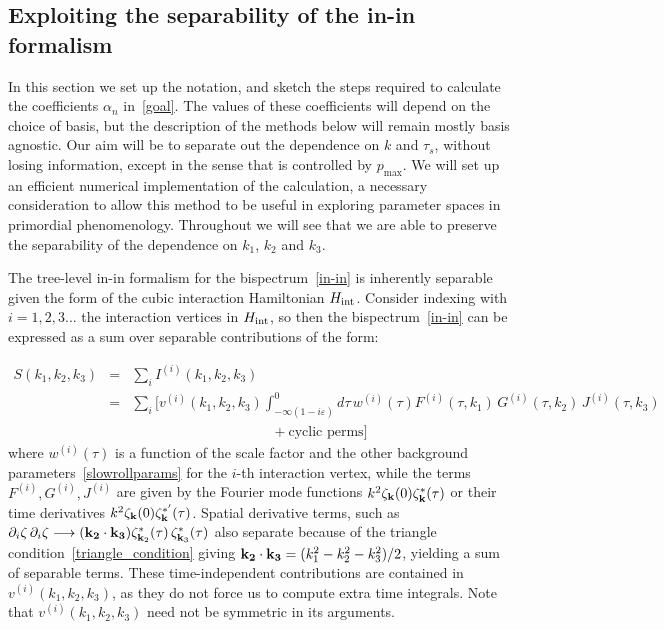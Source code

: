 \documentclass[a4paper,12pt]{extarticle}
\newcommand{\Pmax}{p_\text{max}}
\begin{document}
\subsection{Exploiting the separability of the in-in formalism}
\label{sec:setting_notation}
In this section we set up the notation, and sketch the steps required to calculate the
coefficients $\alpha_n$ in~\eqref{goal}.
The values of these coefficients will depend on the choice
of basis, but the description of the methods below will remain mostly basis agnostic.
Our aim will be to separate out the dependence on $k$ and $\tau_s$,
without losing information, except in the sense that is controlled by $\Pmax$.
We will set up an efficient numerical implementation of the calculation,
a necessary consideration to allow this method to be useful in exploring
parameter spaces in primordial phenomenology.
Throughout we will see that we are able to preserve the
separability of the dependence on $k_1$, $k_2$ and $k_3$.


The tree-level in-in formalism for the bispectrum~\eqref{in-in} is inherently separable given
the form of the cubic interaction Hamiltonian $H_{\rm int}$.
Consider indexing with ${i=1,2,3...}$ the interaction vertices in $H_{\rm int}$,
so then the bispectrum~\eqref{in-in} can be expressed as a sum over separable contributions of the form:


\begin{eqnarray}\label{inin_sep}
S(k_1, k_2,k_3) &=& \sum_i I^{(i)} (k_1, k_2,k_3)\nonumber \\
    &=& \sum_i \bigg[ v^{(i)}(k_1, k_2,k_3) \int^0_{-\infty(1-i\varepsilon)} d\tau\, w^{(i)}(\tau) F^{(i)}(\tau,k_1)\, G^{(i)}(\tau,k_2)\,J^{(i)}(\tau,k_3)\nonumber\\
    &&\quad\quad\quad\quad\quad\quad\quad\quad\quad\quad+ \text{cyclic perms}  \bigg] 
\end{eqnarray}
where $w^{(i)}(\tau)$ is a function of the scale factor and the other background parameters~\eqref{slowrollparams} for the $i$-th interaction vertex, while the terms $F^{(i)}, G^{(i)}, J^{(i)}$ are given by the Fourier mode functions $k^2\zeta_{\bf k}(0)\zeta^{*}_{\bf k}(\tau)$ or their time derivatives $k^2\zeta_{\bf k}(0)\zeta^{*'}_{\bf k}(\tau)$.
Spatial derivative terms, such as  $\partial_i \zeta\, \partial_i\zeta \longrightarrow ({\bf k_2}\cdot {\bf k_3} )\zeta_{{\bf k}_2}^*(\tau)\, \zeta_{{\bf k}_3}^*(\tau)$ also separate because of the triangle condition~\eqref{triangle_condition} giving  ${\bf k_2}\cdot {\bf k_3} = (k_1^2 - k_2^2-k_3^2)/2$, yielding a sum of separable terms.
These time-independent contributions are contained in $v^{(i)}(k_1, k_2,k_3)$,
as they do not force us to compute extra time integrals.
Note that $v^{(i)}(k_1, k_2,k_3)$ need not be symmetric in its arguments.
\end{document}
